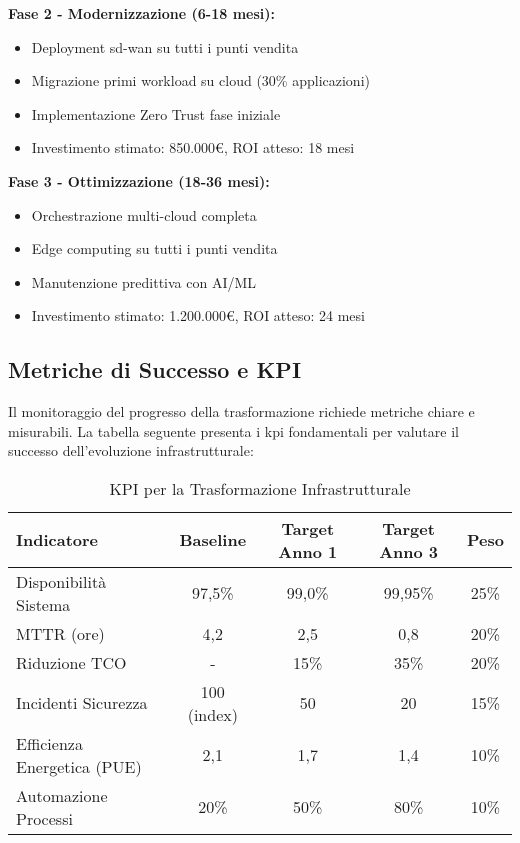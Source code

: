 \textbf{Fase 2 - Modernizzazione (6-18 mesi):}
\begin{itemize}
    \item Deployment \gls{sd-wan} su tutti i punti vendita
    \item Migrazione primi workload su cloud (30\% applicazioni)
    \item Implementazione Zero Trust fase iniziale
    \item Investimento stimato: 850.000€, ROI atteso: 18 mesi
\end{itemize}

\textbf{Fase 3 - Ottimizzazione (18-36 mesi):}
\begin{itemize}
    \item Orchestrazione multi-cloud completa
    \item Edge computing su tutti i punti vendita
    \item Manutenzione predittiva con AI/ML
    \item Investimento stimato: 1.200.000€, ROI atteso: 24 mesi
\end{itemize}

\subsection{Metriche di Successo e KPI}
\label{subsec:success_metrics}

Il monitoraggio del progresso della trasformazione richiede metriche chiare e misurabili. La tabella seguente presenta i \gls{kpi} fondamentali per valutare il successo dell'evoluzione infrastrutturale:

\begin{table}[htbp]
\centering
\caption{KPI per la Trasformazione Infrastrutturale}
\label{tab:transformation_kpi}
\small
\begin{tabularx}{\textwidth}{|X|c|c|c|c|}
\hline
\textbf{Indicatore} & \textbf{Baseline} & \textbf{Target Anno 1} & \textbf{Target Anno 3} & \textbf{Peso} \\
\hline
Disponibilità Sistema & 97,5\% & 99,0\% & 99,95\% & 25\% \\
\hline
MTTR (ore) & 4,2 & 2,5 & 0,8 & 20\% \\
\hline
Riduzione TCO & - & 15\% & 35\% & 20\% \\
\hline
Incidenti Sicurezza & 100 (index) & 50 & 20 & 15\% \\
\hline
Efficienza Energetica (PUE) & 2,1 & 1,7 & 1,4 & 10\% \\
\hline
Automazione Processi & 20\% & 50\% & 80\% & 10\% \\
\hline
\end{tabularx}
\end{table}

